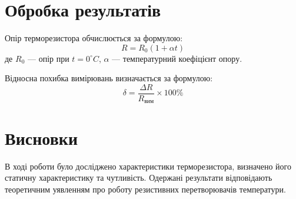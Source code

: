 \documentclass[a4paper]{article}
\begin{document}
\newpage
\section*{Обробка результатів}
Опір терморезистора обчислюється за формулою:
\begin{equation}
    R = R_0 (1 + \alpha t)
\end{equation}
де $R_0$ — опір при $t = 0^{\circ}C$, $\alpha$ — температурний коефіцієнт опору.

Відносна похибка вимірювань визначається за формулою:
\begin{equation}
    \delta = \frac{\Delta R}{R_{вим}} \times 100\%
\end{equation}

\section*{Висновки}
В ході роботи було досліджено характеристики терморезистора, визначено його статичну характеристику та чутливість. Одержані результати відповідають теоретичним уявленням про роботу резистивних перетворювачів температури.
\end{document}
